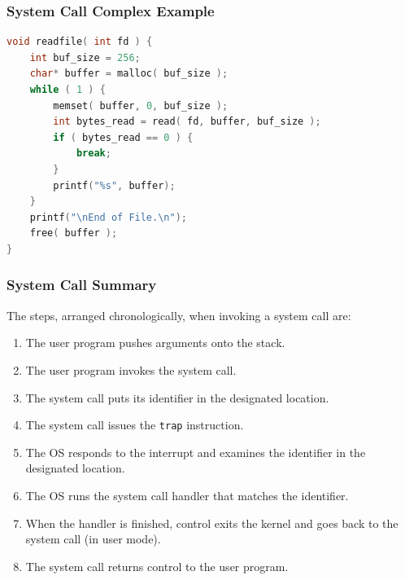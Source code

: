 \begin{frame}[fragile]
	\frametitle{System Call Complex Example}

	\begin{lstlisting}[language=C]
void readfile( int fd ) {
    int buf_size = 256;
    char* buffer = malloc( buf_size );
    while ( 1 ) {
        memset( buffer, 0, buf_size );
        int bytes_read = read( fd, buffer, buf_size );  
        if ( bytes_read == 0 ) {
            break; 
        }     
        printf("%s", buffer);
    }
    printf("\nEnd of File.\n");
    free( buffer );
}
\end{lstlisting}


\end{frame}


\begin{frame}
	\frametitle{System Call Summary}

	The steps, arranged chronologically, when invoking a system call are:
	\begin{enumerate}
		\item The user program pushes arguments onto the stack.
		\item The user program invokes the system call.
		\item The system call puts its identifier in the designated location.
		\item The system call issues the \texttt{trap} instruction.
		\item The OS responds to the interrupt and examines the identifier in the designated location.
		\item The OS runs the system call handler that matches the identifier.
		\item When the handler is finished, control exits the kernel and goes back to the system call (in user mode).
		\item The system call returns control to the user program.

	\end{enumerate}


\end{frame}







